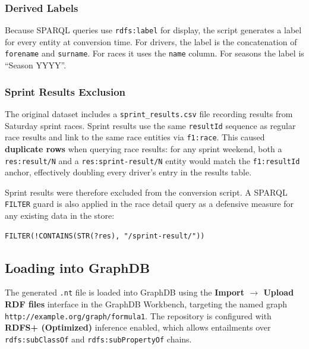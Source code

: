 \documentclass[12pt,a4paper]{article}
\begin{document}
\subsubsection{Derived Labels}

Because SPARQL queries use \texttt{rdfs:label} for display, the script
generates a label for every entity at conversion time. For drivers, the label
is the concatenation of \texttt{forename} and \texttt{surname}. For races it
uses the \texttt{name} column. For seasons the label is ``Season YYYY''.

\subsubsection{Sprint Results Exclusion}

The original dataset includes a \texttt{sprint\_results.csv} file recording
results from Saturday sprint races. Sprint results use the same
\texttt{resultId} sequence as regular race results and link to the same race
entities via \texttt{f1:race}. This caused \textbf{duplicate rows} when
querying race results: for any sprint weekend, both a \texttt{res:result/N}
and a \texttt{res:sprint-result/N} entity would match the \texttt{f1:resultId}
anchor, effectively doubling every driver's entry in the results table.

Sprint results were therefore excluded from the conversion script. A SPARQL
\texttt{FILTER} guard is also applied in the race detail query as a defensive
measure for any existing data in the store:

\begin{lstlisting}[style=sparql, caption={Filter excluding sprint-result URIs from race result queries}]
FILTER(!CONTAINS(STR(?res), "/sprint-result/"))
\end{lstlisting}

\subsection{Loading into GraphDB}

The generated \texttt{.nt} file is loaded into GraphDB using the \textbf{Import
$\rightarrow$ Upload RDF files} interface in the GraphDB Workbench, targeting
the named graph \texttt{http://example.org/graph/formula1}. The repository is
configured with \textbf{RDFS+ (Optimized)} inference enabled, which allows
entailments over \texttt{rdfs:subClassOf} and \texttt{rdfs:subPropertyOf}
chains.

\end{document}

